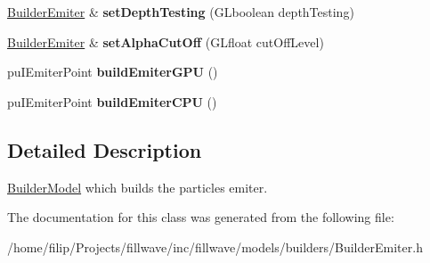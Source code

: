 \begin{DoxyCompactItemize}
\item 
\hyperlink{classflw_1_1flf_1_1BuilderEmiter}{Builder\+Emiter} \& {\bfseries set\+Depth\+Testing} (G\+Lboolean depth\+Testing)\hypertarget{classflw_1_1flf_1_1BuilderEmiter_a03b51afcbae7f0a4506273d3e02d8dfd}{}\label{classflw_1_1flf_1_1BuilderEmiter_a03b51afcbae7f0a4506273d3e02d8dfd}

\item 
\hyperlink{classflw_1_1flf_1_1BuilderEmiter}{Builder\+Emiter} \& {\bfseries set\+Alpha\+Cut\+Off} (G\+Lfloat cut\+Off\+Level)\hypertarget{classflw_1_1flf_1_1BuilderEmiter_ae5272c6a780830b691fda1a58e387ee1}{}\label{classflw_1_1flf_1_1BuilderEmiter_ae5272c6a780830b691fda1a58e387ee1}

\item 
pu\+I\+Emiter\+Point {\bfseries build\+Emiter\+G\+PU} ()\hypertarget{classflw_1_1flf_1_1BuilderEmiter_aadeaaee36e99644da1df706fee362219}{}\label{classflw_1_1flf_1_1BuilderEmiter_aadeaaee36e99644da1df706fee362219}

\item 
pu\+I\+Emiter\+Point {\bfseries build\+Emiter\+C\+PU} ()\hypertarget{classflw_1_1flf_1_1BuilderEmiter_ab42b38f7eb290dac2b6282b191dec767}{}\label{classflw_1_1flf_1_1BuilderEmiter_ab42b38f7eb290dac2b6282b191dec767}

\end{DoxyCompactItemize}


\subsection{Detailed Description}
\hyperlink{classflw_1_1flf_1_1BuilderModel}{Builder\+Model} which builds the particles emiter. 

The documentation for this class was generated from the following file\+:\begin{DoxyCompactItemize}
\item 
/home/filip/\+Projects/fillwave/inc/fillwave/models/builders/Builder\+Emiter.\+h\end{DoxyCompactItemize}
